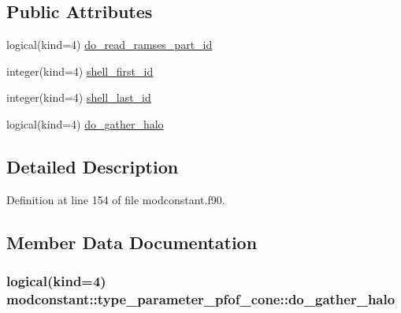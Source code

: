 \subsection*{Public Attributes}
\begin{DoxyCompactItemize}
\item 
logical(kind=4) \hyperlink{structmodconstant_1_1type__parameter__pfof__cone_a72b740a2e3a315cd2df95034048327fa}{do\+\_\+read\+\_\+ramses\+\_\+part\+\_\+id}
\item 
integer(kind=4) \hyperlink{structmodconstant_1_1type__parameter__pfof__cone_a51f2b74874730f91a44f714d515fb423}{shell\+\_\+first\+\_\+id}
\item 
integer(kind=4) \hyperlink{structmodconstant_1_1type__parameter__pfof__cone_a50cff304d33c3b950d4e9f2cb3ffb70d}{shell\+\_\+last\+\_\+id}
\item 
logical(kind=4) \hyperlink{structmodconstant_1_1type__parameter__pfof__cone_add34b2b654fcd0a7d79af2ed53958b3c}{do\+\_\+gather\+\_\+halo}
\end{DoxyCompactItemize}


\subsection{Detailed Description}


Definition at line 154 of file modconstant.\+f90.



\subsection{Member Data Documentation}
\subsubsection[{\texorpdfstring{do\+\_\+gather\+\_\+halo}{do_gather_halo}}]{\setlength{\rightskip}{0pt plus 5cm}logical(kind=4) modconstant\+::type\+\_\+parameter\+\_\+pfof\+\_\+cone\+::do\+\_\+gather\+\_\+halo}\hypertarget{structmodconstant_1_1type__parameter__pfof__cone_add34b2b654fcd0a7d79af2ed53958b3c}{}\label{structmodconstant_1_1type__parameter__pfof__cone_add34b2b654fcd0a7d79af2ed53958b3c}


